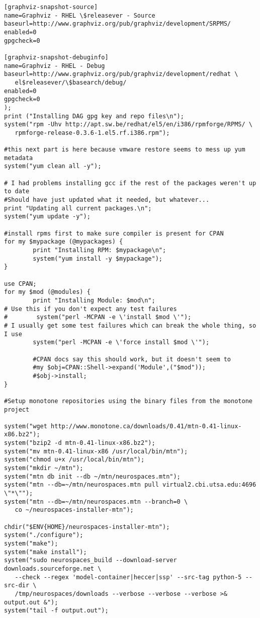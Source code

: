\documentclass[12pt]{article}
\begin{document}
\begin{verbatim}
[graphviz-snapshot-source]
name=Graphviz - RHEL \$releasever - Source
baseurl=http://www.graphviz.org/pub/graphviz/development/SRPMS/
enabled=0
gpgcheck=0

[graphviz-snapshot-debuginfo]
name=Graphviz - RHEL - Debug
baseurl=http://www.graphviz.org/pub/graphviz/development/redhat \
   el$releasever/\$basearch/debug/
enabled=0
gpgcheck=0
);
print ("Installing DAG gpg key and repo files\n");
system("rpm -Uhv http://apt.sw.be/redhat/el5/en/i386/rpmforge/RPMS/ \
   rpmforge-release-0.3.6-1.el5.rf.i386.rpm");

#this next part is here because vmware restore seems to mess up yum metadata
system("yum clean all -y");

# I had problems installing gcc if the rest of the packages weren't up to date
#Should have just updated what it needed, but whatever...
print "Updating all current packages.\n";
system("yum update -y");

#install rpms first to make sure compiler is present for CPAN
for my $mypackage (@mypackages) {
        print "Installing RPM: $mypackage\n";
        system("yum install -y $mypackage");
}

use CPAN;
for my $mod (@modules) {
        print "Installing Module: $mod\n";
# Use this if you don't expect any test failures
#        system("perl -MCPAN -e \'install $mod \'");
# I usually get some test failures which can break the whole thing, so I use
        system("perl -MCPAN -e \'force install $mod \'");

        #CPAN docs say this should work, but it doesn't seem to
        #my $obj=CPAN::Shell->expand('Module',("$mod"));
        #$obj->install;
}

#Setup monotone repositories using the binary files from the monotone project

system("wget http://www.monotone.ca/downloads/0.41/mtn-0.41-linux-x86.bz2");
system("bzip2 -d mtn-0.41-linux-x86.bz2");
system("mv mtn-0.41-linux-x86 /usr/local/bin/mtn");
system("chmod u+x /usr/local/bin/mtn");
system("mkdir ~/mtn");
system("mtn db init --db ~/mtn/neurospaces.mtn");
system("mtn --db=~/mtn/neurospaces.mtn pull virtual2.cbi.utsa.edu:4696 \"*\"");
system("mtn --db=~/mtn/neurospaces.mtn --branch=0 \
   co ~/neurospaces-installer-mtn");

chdir("$ENV{HOME}/neurospaces-installer-mtn");
system("./configure");
system("make");
system("make install");
system("sudo neurospaces_build --download-server downloads.sourceforge.net \
   --check --regex 'model-container|heccer|ssp' --src-tag python-5 --src-dir \
   /tmp/neurospaces/downloads --verbose --verbose --verbose >& output.out &");
system("tail -f output.out");
\end{verbatim}
\end{document}
